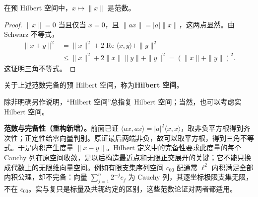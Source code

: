 \documentclass[../../main.tex]{subfiles}
\begin{document}
\begin{proposition}\label{proposition:ch05-induced-norm}
在预 Hilbert 空间中，$x\mapsto\|x\|$ 是范数。
\end{proposition}
\begin{proof}
$\|x\|=0$ 当且仅当 $x=0$，且 $\|ax\|=|a|\|x\|$，这两点显然。由 Schwarz 不等式，
\begin{align*}
\|x+y\|^2&=\|x\|^2+2\operatorname{Re}\langle x,y\rangle+\|y\|^2\\
&\leqslant\|x\|^2+2\|x\|\|y\|+\|y\|^2=(\|x\|+\|y\|)^2.
\end{align*}
这证明三角不等式。
\end{proof}
\begin{definition}[Hilbert 空间]\label{definition:ch05-hilbert-space}
关于上述范数完备的预 Hilbert 空间，称为\textbf{Hilbert 空间}。
\end{definition}
除非明确另作说明，“Hilbert 空间”总指复 Hilbert 空间；当然，也可以考虑实 Hilbert 空间。
\begin{remark}
\textbf{范数与完备性（重构新增）。}前面已证 $\langle ax,ax\rangle=|a|^2\langle x,x\rangle$，取非负平方根得到齐次性；正定性给零向量判别。原证最后两端非负，故可以取平方根，得到三角不等式。于是内积产生度量 $\|x-y\|$。Hilbert 定义中的完备性要求此度量的每个 Cauchy 列在原空间收敛，是以后构造最近点和无限正交展开的关键；它不能只换成代数上的无限维向量空间。例如有限支集序列空间 $c_{00}$ 配通常 $\ell^2$ 内积满足全部内积公理，却不完备：向量 $\sum_{j=1}^n2^{-j}e_j$ 为 Cauchy 列，其逐坐标极限支集无限，不在 $c_{00}$。实与复只是标量及共轭约定的区别，这些范数论证对两者都适用。
\end{remark}
\end{document}
